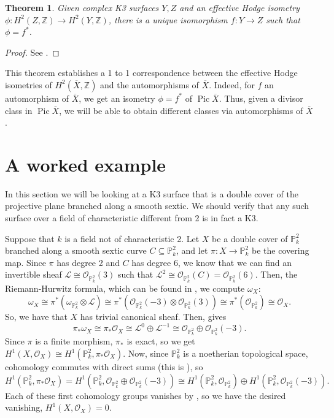 \documentclass[12pt,twoside]{reedthesis}
\theoremstyle{plain}
\newtheorem{theorem}{Theorem}[chapter]
\theoremstyle{definition}
\theoremstyle{remark}
\newcommand{\ZZ}{\mathbb{Z}}
\newcommand{\Proj}{\mathbb{P}}
\newcommand{\calO}{\mathcal{O}}
\newcommand{\calL}{\mathcal{L}}
\newcommand{\Pic}{\operatorname{Pic}}
\begin{document}
\begin{theorem}
Given complex K3 surfaces $Y,Z$ and an effective Hodge isometry $\phi:H^2(Z,\ZZ)\to H^2(Y,\ZZ)$, there is a unique isomorphism $f:Y\to Z$ such that $\phi=f^*$.
\end{theorem}
\begin{proof}
See \cite[Theorem VIII.11.1 and Corollary VIII.11.4]{vanDeVen}.
\end{proof}
\noindent This theorem establishes a 1 to 1 correspondence between the effective Hodge isometries of $H^2(\overline{X},\ZZ)$ and the automorphisms of $\overline{X}$. Indeed, for $f$ an automorphism of $\overline{X}$, we get an isometry $\phi=f^*$ of $\Pic\overline{X}$. Thus, given a divisor class in $\Pic\overline{X}$, we will be able to obtain different classes via automorphisms of $\overline{X}$. 
\section{A worked example}\label{computation}
In this section we will be looking at a K3 surface that is a double cover of the projective plane branched along a smooth sextic. We should verify that any such surface over a field of characteristic different from 2 is in fact a K3. 

Suppose that $k$ is a field not of characteristic 2. Let $X$ be a double cover of $\Proj^2_k$ branched along a smooth sextic curve $C\subseteq\Proj^2_k$, and let $\pi:X\to\Proj^2_k$ be the covering map. Since $\pi$ has degree 2 and $C$ has degree 6, we know that we can find an invertible sheaf $\calL\cong\calO_{\Proj^2_k}(3)$ such that $\calL^2\cong\calO_{\Proj^2_k}(C)=\calO_{\Proj^2_k}(6)$. Then, the Riemann-Hurwitz formula, which can be found in \cite[Lemma I.17.1]{vanDeVen}, we compute $\omega_X$:
\[
\omega_X\cong\pi^*(\omega_{\Proj^2_k}\otimes\calL)\cong\pi^*(\calO_{\Proj^2_k}(-3)\otimes\calO_{\Proj^2_k}(3))\cong\pi^*(\calO_{\Proj^2_k})\cong\calO_X.
\]
\noindent So, we have that $X$ has trivial canonical sheaf. Then, \cite[Lemma I.17.2]{vanDeVen} gives
\[
\pi_*\omega_X\cong\pi_*\calO_X\cong\calL^0\oplus\calL^{-1}\cong\calO_{\Proj^2_k}\oplus\calO_{\Proj^2_k}(-3).
\]
Since $\pi$ is a finite morphism, $\pi_*$ is exact, so we get $H^1(X,\calO_X)\cong H^1(\Proj^2_k,\pi_*\calO_X)$. Now, since $\Proj^2_k$ is a noetherian topological space, cohomology commutes with direct sums (this is \cite[Proposition III.2.9]{hartshorne}), so 
\[
H^1(\Proj^2_k,\pi_*\calO_X)=H^1(\Proj^2_k,\calO_{\Proj^2_k}\oplus\calO_{\Proj^2_k}(-3))\cong H^1(\Proj^2_k,\calO_{\Proj^2_k})\oplus H^1(\Proj^2_k,\calO_{\Proj^2_k}(-3)).
\]
Each of these first cohomology groups vanishes by \cite[Theorem III.5.1]{hartshorne}, so we have the desired vanishing, $H^1(X,\calO_X)=0$.
\end{document}
